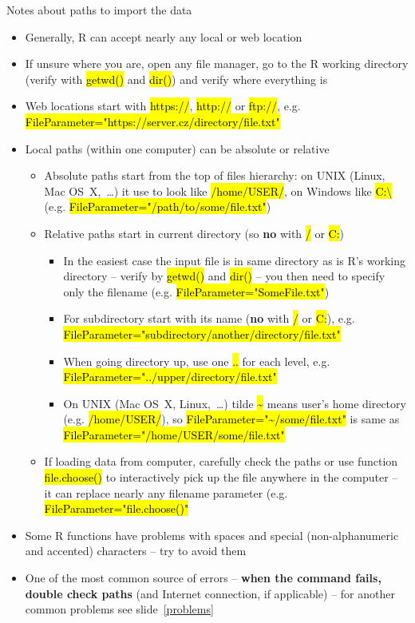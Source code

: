 \documentclass[compress, ucs, xelatex, 11pt, xcolor=svgnames,
  hyperref={
    bookmarks=true,
    unicode=true,
    colorlinks=true,
    pdftitle={Molecular data in R},
    plainpages=false,
    pdfauthor={Vojtech Zeisek},
    pdfsubject={Course about phylogeny and evolution in R},
    pdfcreator={XeLaTeX},
    pdfkeywords={R, evolution, phylogeny, molecular data},
    linkcolor=Tomato,
    anchorcolor=SaddleBrown,
    citecolor=Goldenrod,
    filecolor=DarkMagenta,
    menucolor=Sienna,
    urlcolor=DarkTurquoise,
    pdftex},
  url={hyphens, lowtilde} %
  ]{beamer}
\renewcommand{\texttt}[1]{\hl{\ttfamily #1}}
\begin{document}
\begin{frame}[allowframebreaks]{Notes about paths to import the data}
  \label{path}
  \begin{itemize}
    \item Generally, R can accept nearly any local or web location
    \item If unsure where you are, open any file manager, go to the R working directory (verify with \texttt{getwd()} and \texttt{dir()}) and verify where everything is
    \item Web locations start with \texttt{https://}, \texttt{http://} or \texttt{ftp://}, e.g. \texttt{FileParameter="https://server.cz/directory/file.txt"}
    \item Local paths (within one computer) can be absolute or relative
    \begin{itemize}
      \item Absolute paths start from the top of files hierarchy: on UNIX (Linux, Mac OS~X,~\ldots) it use to look like \texttt{/home/USER/}, on Windows like \texttt{C:\textbackslash} (e.g. \texttt{FileParameter="/path/to/some/file.txt"})
      \item Relative paths start in current directory (so \textbf{no} with \texttt{/} or \texttt{C:})
      \begin{itemize}
	\item In the easiest case the input file is in same directory as is R's working directory -- verify by \texttt{getwd()} and \texttt{dir()} -- you then need to specify only the filename (e.g. \texttt{FileParameter="SomeFile.txt"})
	\item For subdirectory start with its name (\textbf{no} with \texttt{/} or \texttt{C:}), e.g. \texttt{FileParameter="subdirectory/another/directory/file.txt"}
	\item When going directory up, use one \texttt{..} for each level, e.g. \texttt{FileParameter="../upper/directory/file.txt"}
	\item On UNIX (Mac OS~X, Linux,~\ldots) tilde \texttt{\textasciitilde} means user's home directory (e.g. \texttt{/home/USER/}), so \texttt{FileParameter="\textasciitilde/some/file.txt"} is same as \texttt{FileParameter="/home/USER/some/file.txt"}
      \end{itemize}
      \item If loading data from computer, carefully check the paths or use function \texttt{file.choose()} to interactively pick up the file anywhere in the computer -- it can replace nearly any filename parameter (e.g. \texttt{FileParameter="file.choose()"}
    \end{itemize}
    \item Some R functions have problems with spaces and special (non-alphanumeric and accented) characters -- try to avoid them
    \item One of the most common source of errors -- \textbf{when the command fails, double check paths} (and Internet connection, if applicable) -- for another common problems see slide~\ref{problems}
  \end{itemize}
\end{frame}
\end{document}
